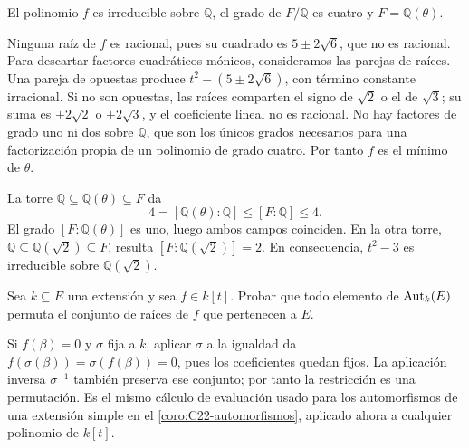 \begin{ejem}\label{ejem:C23-bicuadratica}
El polinomio $f$ es irreducible sobre $\mathbb Q$, el grado de $F/\mathbb Q$ es cuatro y $F=\mathbb Q(\theta)$.

Ninguna raíz de $f$ es racional, pues su cuadrado es $5\pm2\sqrt6$, que no es racional. Para descartar factores cuadráticos mónicos, consideramos las parejas de raíces. Una pareja de opuestas produce $t^2-(5\pm2\sqrt6)$, con término constante irracional. Si no son opuestas, las raíces comparten el signo de $\sqrt2$ o el de $\sqrt3$; su suma es $\pm2\sqrt2$ o $\pm2\sqrt3$, y el coeficiente lineal no es racional. No hay factores de grado uno ni dos sobre $\mathbb Q$, que son los únicos grados necesarios para una factorización propia de un polinomio de grado cuatro. Por tanto $f$ es el mínimo de $\theta$.

La torre $\mathbb Q\subseteq\mathbb Q(\theta)\subseteq F$ da
\[
4=[\mathbb Q(\theta):\mathbb Q]\leq[F:\mathbb Q]\leq4.
\]
El grado $[F:\mathbb Q(\theta)]$ es uno, luego ambos campos coinciden. En la otra torre, $\mathbb Q\subseteq\mathbb Q(\sqrt2)\subseteq F$, resulta $[F:\mathbb Q(\sqrt2)]=2$. En consecuencia, $t^2-3$ es irreducible sobre $\mathbb Q(\sqrt2)$.
\end{ejem}

\begin{ejer}\label{ejer:C23-raices-aut}
Sea $k\subseteq E$ una extensión y sea $f\in k[t]$. Probar que todo elemento de $\operatorname{Aut}_k(E)$ permuta el conjunto de raíces de $f$ que pertenecen a $E$.
\end{ejer}
\begin{sol}
Si $f(\beta)=0$ y $\sigma$ fija a $k$, aplicar $\sigma$ a la igualdad da $f(\sigma(\beta))=\sigma(f(\beta))=0$, pues los coeficientes quedan fijos. La aplicación inversa $\sigma^{-1}$ también preserva ese conjunto; por tanto la restricción es una permutación. Es el mismo cálculo de evaluación usado para los automorfismos de una extensión simple en el \cref{coro:C22-automorfismos}, aplicado ahora a cualquier polinomio de $k[t]$.
\end{sol}

